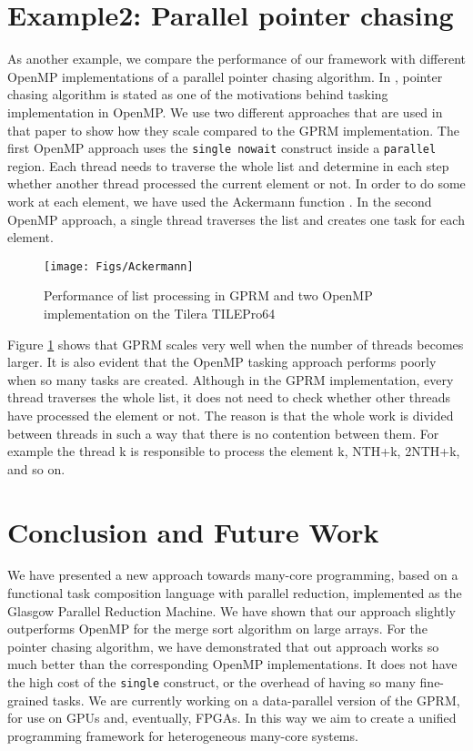 \documentclass[copyright,creativecommons]{eptcs}
\begin{document}
\section{Example2: Parallel pointer chasing\label{sec:Example2:-Parallel-pointer}}

As another example, we compare the performance of our framework with
different OpenMP implementations of a parallel pointer chasing algorithm.
In \cite{ayguade2009design}, pointer chasing algorithm is stated
as one of the motivations behind tasking implementation in OpenMP.
We use two different approaches that are used in that paper to show
how they scale compared to the GPRM implementation. The first OpenMP
approach uses the \texttt{single nowait} construct inside a \texttt{parallel}
region. Each thread needs to traverse the whole list and determine
in each step whether another thread processed the current element
or not. In order to do some work at each element, we have used the
Ackermann function \cite{sundblad1971ackermann}. In the second OpenMP
approach, a single thread traverses the list and creates one task
for each element.

\begin{figure}[H]
\begin{centering}
\texttt{[image: Figs/Ackermann]}
\par\end{centering}

\caption{\label{fig:Ackermann}Performance of list processing in GPRM and two
OpenMP implementation on the Tilera TILEPro64}
\end{figure}


Figure \ref{fig:Ackermann} shows that GPRM scales very well when
the number of threads becomes larger. It is also evident that the
OpenMP tasking approach performs poorly when so many tasks are created.
Although in the GPRM implementation, every thread traverses the whole
list, it does not need to check whether other threads have processed
the element or not. The reason is that the whole work is divided between
threads in such a way that there is no contention between them. For
example the thread k is responsible to process the element k, NTH+k,
2NTH+k, and so on.


\section{Conclusion and Future Work}

We have presented a new approach towards many-core programming, based
on a functional task composition language with parallel reduction,
implemented as the Glasgow Parallel Reduction Machine. We have shown
that our approach slightly outperforms OpenMP for the merge sort algorithm
on large arrays. For the pointer chasing algorithm, we have demonstrated
that out approach works so much better than the corresponding OpenMP
implementations. It does not have the high cost of the \texttt{single}
construct, or the overhead of having so many fine-grained tasks. We
are currently working on a data-parallel version of the GPRM, for
use on GPUs and, eventually, FPGAs. In this way we aim to create a
unified programming framework for heterogeneous many-core systems.
\end{document}
